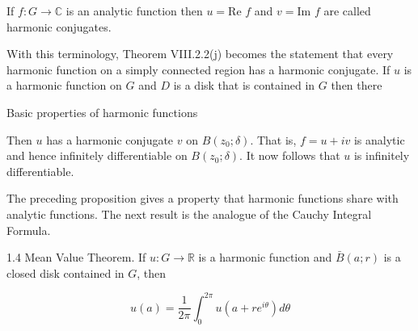 If $f: G \to \mathbb{C}$ is an analytic function then $u = \text{Re } f$ and $v = \text{Im } f$ are called harmonic conjugates.

With this terminology, Theorem VIII.2.2(j) becomes the statement that every harmonic function on a simply connected region has a harmonic conjugate. If $u$ is a harmonic function on $G$ and $D$ is a disk that is contained in $G$ then there

Basic properties of harmonic functions

Then $u$ has a harmonic conjugate $v$ on $B(z_0; \delta)$. That is, $f = u + iv$ is analytic and hence infinitely differentiable on $B(z_0; \delta)$. It now follows that $u$ is infinitely differentiable.

The preceding proposition gives a property that harmonic functions share with analytic functions. The next result is the analogue of the Cauchy Integral Formula.

1.4 Mean Value Theorem. If $u: G \rightarrow \mathbb{R}$ is a harmonic function and $\bar{B}(a; r)$ is a closed disk contained in $G$, then

$$u(a) = \frac{1}{2\pi} \int_0^{2\pi} u(a + re^{i\theta}) d\theta$$